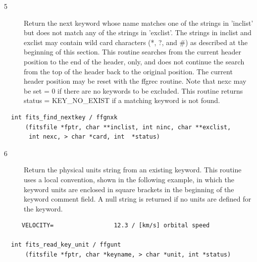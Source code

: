 \documentclass[11pt]{book}
\begin{document}
\begin{description}
\item[5 ] Return the next keyword whose name matches one of the strings in
    'inclist' but does not match any of the strings in 'exclist'.
    The strings in inclist and exclist may contain wild card characters
    (*, ?, and \#) as described at the beginning of this section.
    This routine searches from the current header position to the
    end of the header, only, and does not continue the search from
    the top of the header back to the original position.  The current
    header position may be reset with the ffgrec routine.  Note
    that nexc may be set = 0 if there are no keywords to be excluded.
    This routine returns status = KEY\_NO\_EXIST if a matching
   keyword is not found. \label{ffgnxk}
\end{description}

\begin{verbatim}
  int fits_find_nextkey / ffgnxk
      (fitsfile *fptr, char **inclist, int ninc, char **exclist,
       int nexc, > char *card, int  *status)
\end{verbatim}

\begin{description}
\item[6 ] Return the physical units string from an existing keyword.  This
    routine uses a local convention, shown in the following example,
    in which the keyword units are enclosed in square brackets in the
    beginning of the keyword comment field.  A null string is returned
   if no units are defined for the keyword.  \label{ffgunt}
\end{description}

\begin{verbatim}
     VELOCITY=                 12.3 / [km/s] orbital speed

  int fits_read_key_unit / ffgunt
      (fitsfile *fptr, char *keyname, > char *unit, int *status)
\end{verbatim}
\end{document}
